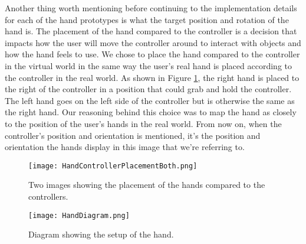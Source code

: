 Another thing worth mentioning before continuing to the implementation details for each of the hand prototypes is what the target position and rotation of the hand is. The placement of the hand compared to the controller is a decision that impacts how the user will move the controller around to interact with objects and how the hand feels to use. We chose to place the hand compared to the controller in the virtual world in the same way the user's real hand is placed according to the controller in the real world. As shown in Figure \ref{fig:handControllerPlacement}, the right hand is placed to the right of the controller in a position that could grab and hold the controller. The left hand goes on the left side of the controller but is otherwise the same as the right hand. Our reasoning behind this choice was to map the hand as closely to the position of the user's hands in the real world. From now on, when the controller's position and orientation is mentioned, it's the position and orientation the hands display in this image that we're referring to.

\begin{figure}[h]
\centering
\texttt{[image: HandControllerPlacementBoth.png]}
\caption{Two images showing the placement of the hands compared to the controllers.}
\label{fig:handControllerPlacement}
\end{figure}

\begin{figure}[h]
\centering
\texttt{[image: HandDiagram.png]}
\caption{Diagram showing the setup of the hand.}
\label{fig:handDiagram}
\end{figure}

